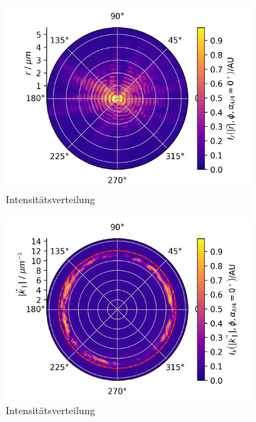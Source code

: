 \documentclass[titlepage,  ngerman]{article}
\begin{document}
	\begin{figure}[h]		
		\centering
		\begin{subfigure}{0.49\textwidth}
			\centering
			\includegraphics[width=\textwidth]{figures/new/B_1_fp_0.png}
			\caption{Intensitätsverteilung}
			\label{fig:dirt_polar_fp}
		\end{subfigure}
		\begin{subfigure}{0.5\textwidth}
			\centering
			\includegraphics[width=\textwidth]{figures/new/B_1_bfp_90.png}
			\caption{Intensitätsverteilung}
			\label{fig:dirt_polar}
		\end{subfigure}
		\begin{subfigure}{0.5\textwidth}
			\centering

\end{subfigure}
\end{figure}
\end{document}
